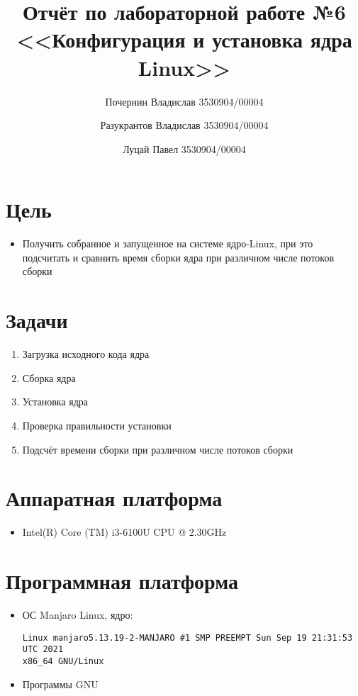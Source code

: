 \documentclass[a4paper]{article}
\title{Отчёт по лабораторной работе №6\\<<Конфигурация и установка ядра Linux>>}
\author{
    Почернин Владислав 3530904/00004
    \and
    Разукрантов Владислав 3530904/00004
    \and
    Луцай Павел 3530904/00004
}
\begin{document}
    \maketitle


    \section{Цель}
    \begin{itemize}
        \item Получить собранное и запущенное на системе ядро-Linux, при это
        подсчитать и сравнить время сборки ядра при различном числе потоков сборки
    \end{itemize}


    \section{Задачи}
    \begin{enumerate}
        \item Загрузка исходного кода ядра
        \item Сборка ядра
        \item Установка ядра
        \item Проверка правильности установки
        \item Подсчёт времени сборки при различном числе потоков сборки
    \end{enumerate}


    \section{Аппаратная платформа}
    \begin{itemize}
        \item Intel(R) Core (TM) i3-6100U CPU @ 2.30GHz
    \end{itemize}


    \section{Программная платформа}
    \begin{itemize}
        \item ОС Manjaro Linux, ядро:
        \begin{verbatim}
Linux manjaro5.13.19-2-MANJARO #1 SMP PREEMPT Sun Sep 19 21:31:53 UTC 2021
x86_64 GNU/Linux
        \end{verbatim}
        \item Программы GNU
    \end{itemize}
\end{document}
